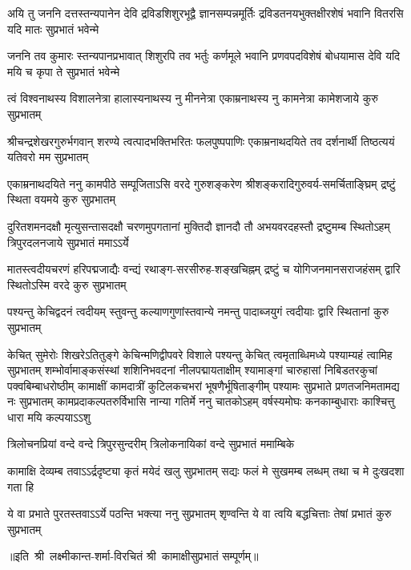 \fourlineindentedshloka
{अयि तु जननि दत्तस्तन्यपानेन देवि}
{द्रविडशिशुरभूद्वै ज्ञानसम्पन्नमूर्तिः}
{द्रविडतनयभुक्तक्षीरशेषं भवानि}
{वितरसि यदि मातः सुप्रभातं भवेन्मे}

\fourlineindentedshloka
{जननि तव कुमारः स्तन्यपानप्रभावात्}
{शिशुरपि तव भर्तुः कर्णमूले भवानि}
{प्रणवपदविशेषं बोधयामास देवि}
{यदि मयि च कृपा ते सुप्रभातं भवेन्मे}

\fourlineindentedshloka
{त्वं विश्वनाथस्य विशालनेत्रा}
{हालास्यनाथस्य नु मीननेत्रा}
{एकाम्रनाथस्य नु कामनेत्रा}
{कामेशजाये कुरु सुप्रभातम्}

\fourlineindentedshloka
{श्रीचन्द्रशेखरगुरुर्भगवान् शरण्ये}
{त्वत्पादभक्तिभरितः फलपुष्पपाणिः}
{एकाम्रनाथदयिते तव दर्शनार्थी}
{तिष्ठत्ययं यतिवरो मम सुप्रभातम्}

\fourlineindentedshloka
{एकाम्रनाथदयिते ननु कामपीठे}
{सम्पूजिताऽसि वरदे गुरुशङ्करेण}
{श्रीशङ्करादिगुरुवर्य-समर्चिताङ्घ्रिम्}
{द्रष्टुं स्थिता वयमये कुरु सुप्रभातम्}

\fourlineindentedshloka
{दुरितशमनदक्षौ मृत्युसन्तासदक्षौ}
{चरणमुपगतानां मुक्तिदौ ज्ञानदौ तौ}
{अभयवरदहस्तौ द्रष्टुमम्ब स्थितोऽहम्}
{त्रिपुरदलनजाये सुप्रभातं ममाऽऽर्ये}

\fourlineindentedshloka
{मातस्त्वदीयचरणं हरिपद्मजाद्यैः}
{वन्द्यं रथाङ्ग-सरसीरुह-शङ्खचिह्नम्}
{द्रष्टुं च योगिजनमानसराजहंसम्}
{द्वारि स्थितोऽस्मि वरदे कुरु सुप्रभातम्}

\fourlineindentedshloka
{पश्यन्तु केचिद्वदनं त्वदीयम्}
{स्तुवन्तु कल्याणगुणांस्तवान्ये}
{नमन्तु पादाब्जयुगं त्वदीयाः}
{द्वारि स्थितानां कुरु सुप्रभातम्}

\fourlineindentedshloka
{केचित् सुमेरोः शिखरेऽतितुङ्गे}
{केचिन्मणिद्वीपवरे विशाले}
{पश्यन्तु केचित् त्वमृताब्धिमध्ये}
{पश्याम्यहं त्वामिह सुप्रभातम्}
\setlength{\shlokaspaceskip}{16pt}
\fourlineindentedshloka
{शम्भोर्वामाङ्कसंस्थां शशिनिभवदनां नीलपद्मायताक्षीम्}
{श्यामाङ्गां चारुहासां निबिडतरकुचां पक्वबिम्बाधरोष्ठीम्}
{कामाक्षीं कामदात्रीं कुटिलकचभरां भूषणैर्भूषिताङ्गीम्}
{पश्यामः सुप्रभाते प्रणतजनिमतामद्य नः सुप्रभातम्}
\setlength{\shlokaspaceskip}{24pt}
\fourlineindentedshloka
{कामप्रदाकल्पतरुर्विभासि}
{नान्या गतिर्मे ननु चातकोऽहम्}
{वर्षस्यमोघः कनकाम्बुधाराः}
{काश्चित्तु धारा मयि कल्पयाऽऽशु}

\twolineshloka
{त्रिलोचनप्रियां वन्दे वन्दे त्रिपुरसुन्दरीम्}
{त्रिलोकनायिकां वन्दे सुप्रभातं ममाम्बिके}

\fourlineindentedshloka
{कामाक्षि देव्यम्ब तवाऽऽर्द्रदृष्ट्या}
{कृतं मयेदं खलु सुप्रभातम्}
{सद्यः फलं मे सुखमम्ब लब्धम्}
{तथा च मे दुःखदशा गता हि}

\fourlineindentedshloka
{ये वा प्रभाते पुरतस्तवाऽऽर्ये}
{पठन्ति भक्त्या ननु सुप्रभातम्}
{शृण्वन्ति ये वा त्वयि बद्धचित्ताः}
{तेषां प्रभातं कुरु सुप्रभातम्}

॥इति~श्री~लक्ष्मीकान्त-शर्मा-विरचितं श्री~कामाक्षीसुप्रभातं सम्पूर्णम्॥